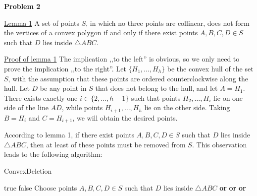 \documentclass[12pt]{article}
\begin{document}
	\bigskip
	
	\textbf{Problem 2}
	
	\medskip
	
	\underline{Lemma 1} A set of points \(S\), in which no three points are
	collinear, does not form the vertices of a convex polygon if and only if
	there exist points \(A, B, C, D \in S\) such that \(D\) lies inside
	\(\triangle ABC\).
	
	\medskip
	
	\underline{Proof of lemma 1} The implication ,,to the left'' is obvious,
	so we only need to prove the implication ,,to the right''. Let \(\{H_{1},
	\ldots, H_{h}\}\) be the convex hull of the set \(S\), with the assumption
	that these points are ordered counterclockwise along the hull. Let \(D\) be
	any point in \(S\) that does not belong to the hull, and let \(A = H_{1}\).
	There exists exactly one \(i \in \{2, \ldots, h - 1\}\) such that points
	\(H_{2}, \ldots, H_{i}\) lie on one side of the line \(AD\), while points
	\(H_{i + 1}, \ldots, H_{h}\) lie on the other side. Taking \(B = H_{i}\) and
	\(C = H_{i + 1}\), we will obtain the desired points.
	
	\newpage
	
	According to lemma 1, if there exist points \(A, B, C, D \in S\) such that
	\(D\) lies inside \(\triangle ABC\), then at least of these points must be
	removed from \(S\). This observation leads to the following algorithm:
	
	\begin{algorithm}
		\caption{ConvexDeletion} \label{alg:alg1}
		\begin{algorithmic}[1]
			        \State \Return true
			    \EndIf
			        \State \Return false
			    \EndIf
			    \State Choose points $A, B, C, D \in S$ such that $D$ lies
			           inside $\triangle ABC$
			    \State \Return {}
			           \textbf{or}
			           \textbf{or}
			    \Statex \hspace{4.685em}
			           \textbf{or}
			\EndProcedure
		\end{algorithmic}
	\end{algorithm}
	
\end{document}
